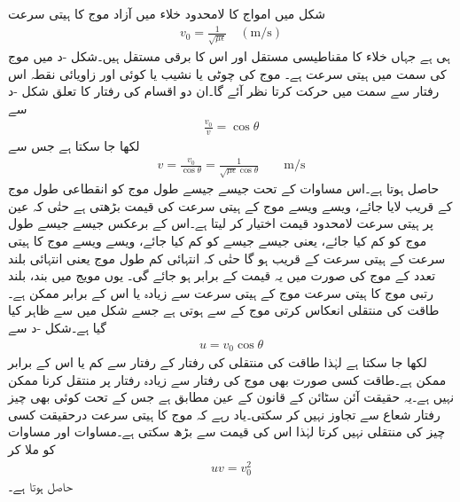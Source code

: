 شکل  میں  امواج کا    لامحدود خلاء میں آزاد موج کا ہیتی سرعت
\begin{align}
v_0=\frac{1}{\sqrt{\mu \epsilon}} \quad (\si{\meter \per \second})
\end{align}
ہی ہے جہاں خلاء کا مقناطیسی مستقل  اور اس کا برقی مستقل  ہیں۔شکل -د میں  موج کی  سمت میں ہیتی سرعت  ہے۔ موج کی چوٹی یا نشیب یا کوئی اور زاویائی نقطہ اس رفتار سے  سمت میں حرکت کرتا نظر آئے گا۔ان دو اقسام کی رفتار کا تعلق شکل -د سے
\begin{align}
\frac{v_0}{v}=\cos \theta
\end{align}
لکھا جا سکتا ہے جس سے
\begin{align}\label{مساوات_مویج_دوری_رفتار_تعلق_الف}
v=\frac{v_0}{\cos \theta}=\frac{1}{\sqrt{\mu \epsilon} \cos \theta} \quad \quad \si{\meter\per\second}
\end{align}
حاصل ہوتا ہے۔اس مساوات کے تحت جیسے جیسے طول موج کو انقطاعی طول موج کے قریب لایا جائے، ویسے ویسے  موج کے ہیتی سرعت کی قیمت بڑھتی ہے حتٰی کہ عین  پر ہیتی سرعت لامحدود قیمت اختیار کر لیتا ہے۔اس کے برعکس جیسے جیسے طول موج کو کم کیا جائے، یعنی جیسے جیسے  کو کم کیا جائے، ویسے ویسے  موج کا  ہیتی سرعت  کے ہیتی سرعت کے قریب ہو گا حتٰی کہ انتہائی کم طول موج یعنی انتہائی بلند تعدد کے موج کی صورت میں یہ قیمت  کے برابر ہو جائے گی۔ یوں مویج میں بند، بلند رتبی موج کا ہیتی سرعت  موج کے ہیتی سرعت سے زیادہ یا اس کے برابر ممکن ہے۔طاقت کی منتقلی انعکاس کرتی موج کے  سے ہوتی ہے جسے شکل میں  سے ظاہر کیا گیا ہے۔شکل -د سے
\begin{align}\label{مساوات_مویج_دوری_رفتار_تعلق_ب}
u=v_0 \cos \theta
\end{align}
لکھا جا سکتا ہے لہٰذا طاقت کی منتقلی کی رفتار  کے رفتار سے کم یا اس کے برابر ممکن ہے۔طاقت کسی صورت بھی  موج کی رفتار سے زیادہ رفتار پر منتقل کرنا ممکن نہیں ہے۔یہ حقیقت آئن سٹائن کے قانون کے عین مطابق ہے جس کے تحت کوئی بھی چیز رفتار شعاع سے تجاوز نہیں کر سکتی۔یاد رہے کہ  موج کا  ہیتی سرعت درحقیقت کسی چیز کی منتقلی نہیں کرتا لہٰذا اس کی قیمت  سے بڑھ سکتی ہے۔مساوات  اور مساوات   کو ملا کر 
\begin{align}\label{مساوات_مویج_دوری_رفتار_تعلق_پ}
u v =v_0^2
\end{align}
حاصل ہوتا ہے۔

